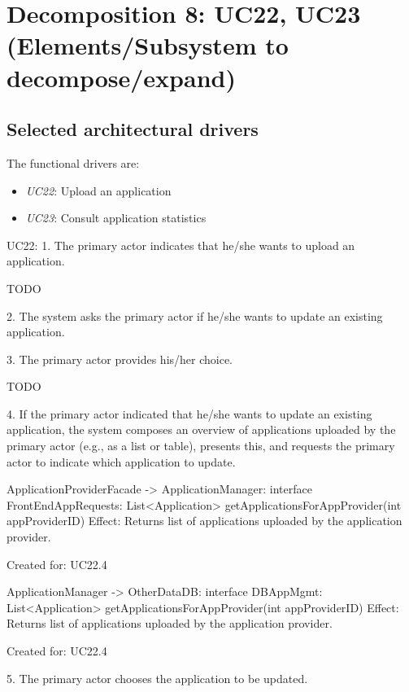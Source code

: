 \section{Decomposition 8: UC22, UC23 (Elements/Subsystem to decompose/expand)}


\subsection{Selected architectural drivers}
    The functional drivers are:
    \begin{itemize}
        \item \emph{UC22}: Upload an application
        \item \emph{UC23}: Consult application statistics
    \end{itemize}

    UC22:
        1. The primary actor indicates that he/she wants to upload an application.

            TODO

        2. The system asks the primary actor if he/she wants to update an existing application.



        3. The primary actor provides his/her choice.

            TODO

        4. If the primary actor indicated that he/she wants to update an existing application, the system composes an overview of applications uploaded by the primary actor (e.g., as a list or table), presents this, and requests the primary actor to indicate which application to update.

            ApplicationProviderFacade -> ApplicationManager: interface FrontEndAppRequests:
                                                List<Application> getApplicationsForAppProvider(int appProviderID)
                Effect: Returns list of applications uploaded by the application provider.
                \item Created for: UC22.4

            ApplicationManager -> OtherDataDB: interface DBAppMgmt:
                                                List<Application> getApplicationsForAppProvider(int appProviderID)
                Effect: Returns list of applications uploaded by the application provider.
                \item Created for: UC22.4


        5. The primary actor chooses the application to be updated.

